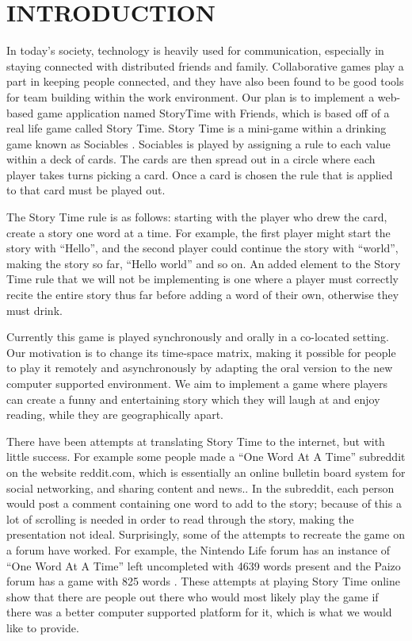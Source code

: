\documentclass{sigchi}
\begin{document}


\section{INTRODUCTION}
In today's society, technology is heavily used for communication, especially in staying connected with distributed friends and family. Collaborative games play a part in keeping people connected, and they have also been found to be good tools for team building within the work environment. Our plan is to implement a web-based game application named StoryTime with Friends, which is based off of a real life game called Story Time. Story Time is a mini-game within a drinking game known as Sociables \cite{sociablesrules}. Sociables is played by assigning a rule to each value within a deck of cards. The cards are then spread out in a circle where each player takes turns picking a card. Once a card is chosen the rule that is applied to that card must be played out.

The Story Time rule is as follows: starting with the player who drew the card, create a story one word at a time. For example, the first player might start the story with ``Hello'', and the second player could continue the story with ``world'', making the story so far, ``Hello world'' and so on. An added element to the Story Time rule that we will not be implementing is one where a player must correctly recite the entire story thus far before adding a word of their own, otherwise they must drink. 

Currently this game is played synchronously and orally in a co-located setting. Our motivation is to change its time-space matrix, making it possible for people to play it remotely and asynchronously by adapting the oral version to the new computer supported environment. We aim to implement a game where players can create a funny and entertaining story which they will laugh at and enjoy reading, while they are geographically apart.

There have been attempts at translating Story Time to the internet, but with little success. For example some people made a ``One Word At A Time'' subreddit on the website reddit.com, which is essentially an online bulletin board system for social networking, and sharing content and news.\cite{reddit}. In the subreddit, each person would post a comment containing one word to add to the story; because of this a lot of scrolling is needed in order to read through the story, making the presentation not ideal. Surprisingly, some of the attempts to recreate the game on a forum have worked. For example, the Nintendo Life forum has an instance of ``One Word At A Time'' left uncompleted with 4639 words present \cite{nintendo-life} and the Paizo forum has a game with 825 words \cite{paizo}. These attempts at playing Story Time online show that there are people out there who would most likely play the game if there was a better computer supported platform for it, which is what we would like to provide.
\end{document}
